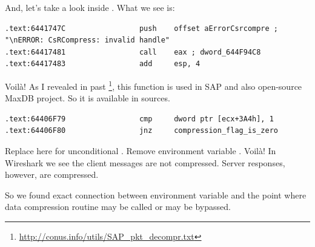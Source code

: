 {And, let's take a look inside . What we see is:}

\begin{lstlisting}
.text:6441747C                 push    offset aErrorCsrcompre ; "\nERROR: CsRCompress: invalid handle"
.text:64417481                 call    eax ; dword_644F94C8
.text:64417483                 add     esp, 4
\end{lstlisting}

Voilà! 
{As I revealed in past}
\footnote{\url{http://conus.info/utils/SAP_pkt_decompr.txt}},
{this function is used in SAP and also open-source MaxDB project. 
So it is available in sources.}


\begin{lstlisting}
.text:64406F79                 cmp     dword ptr [ecx+3A4h], 1
.text:64406F80                 jnz     compression_flag_is_zero
\end{lstlisting}

{Replace \JNZ here for unconditional \JMP. Remove environment variable \TDWNC.} Voilà! 
{In Wireshark we see the client messages are not compressed. Server responses, however, are compressed.}

{So we found exact connection between environment variable and the point where data compression 
routine may be called or may be bypassed.}

